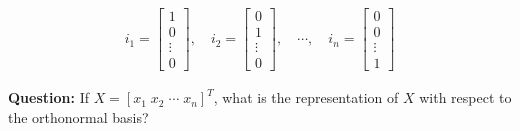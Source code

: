 \begin{align}
i_1 =
\begin{bmatrix}
  1 \\ 0 \\ \vdots \\ 0
\end{bmatrix},
\quad
i_2 =
\begin{bmatrix}
  0 \\ 1 \\ \vdots \\ 0
\end{bmatrix},
\quad \cdots, \quad
i_n =
\begin{bmatrix}
  0 \\ 0 \\ \vdots \\ 1
\end{bmatrix}
\end{align}

\noindent \textbf{Question:} If $X = [x_1 \; x_2 \; \cdots \; x_n]^T$, what is
the representation of $X$ with respect to the orthonormal basis?
